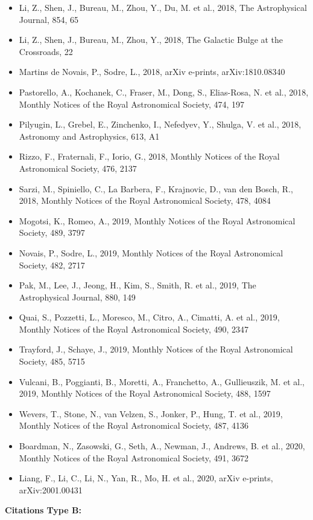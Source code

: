 \documentclass{letter}
\begin{document}
\begin{enumerate}
\begin{itemize}
\item Li, Z., Shen, J., Bureau, M., Zhou, Y., Du, M. et al., 2018, The Astrophysical Journal, 854, 65
\item Li, Z., Shen, J., Bureau, M., Zhou, Y., 2018, The Galactic Bulge at the Crossroads, 22
\item Martins de Novais, P., Sodre, L., 2018, arXiv e-prints, arXiv:1810.08340
\item Pastorello, A., Kochanek, C., Fraser, M., Dong, S., Elias-Rosa, N. et al., 2018, Monthly Notices of the Royal Astronomical Society, 474, 197
\item Pilyugin, L., Grebel, E., Zinchenko, I., Nefedyev, Y., Shulga, V. et al., 2018, Astronomy and Astrophysics, 613, A1
\item Rizzo, F., Fraternali, F., Iorio, G., 2018, Monthly Notices of the Royal Astronomical Society, 476, 2137
\item Sarzi, M., Spiniello, C., La Barbera, F., Krajnovic, D., van den Bosch, R., 2018, Monthly Notices of the Royal Astronomical Society, 478, 4084
\item Mogotsi, K., Romeo, A., 2019, Monthly Notices of the Royal Astronomical Society, 489, 3797
\item Novais, P., Sodre, L., 2019, Monthly Notices of the Royal Astronomical Society, 482, 2717
\item Pak, M., Lee, J., Jeong, H., Kim, S., Smith, R. et al., 2019, The Astrophysical Journal, 880, 149
\item Quai, S., Pozzetti, L., Moresco, M., Citro, A., Cimatti, A. et al., 2019, Monthly Notices of the Royal Astronomical Society, 490, 2347
\item Trayford, J., Schaye, J., 2019, Monthly Notices of the Royal Astronomical Society, 485, 5715
\item Vulcani, B., Poggianti, B., Moretti, A., Franchetto, A., Gullieuszik, M. et al., 2019, Monthly Notices of the Royal Astronomical Society, 488, 1597
\item Wevers, T., Stone, N., van Velzen, S., Jonker, P., Hung, T. et al., 2019, Monthly Notices of the Royal Astronomical Society, 487, 4136
\item Boardman, N., Zasowski, G., Seth, A., Newman, J., Andrews, B. et al., 2020, Monthly Notices of the Royal Astronomical Society, 491, 3672
\item Liang, F., Li, C., Li, N., Yan, R., Mo, H. et al., 2020, arXiv e-prints, arXiv:2001.00431
\end{itemize}
{\bf Citations Type B:}
\begin{itemize}

\end{itemize}
\end{enumerate}
\end{document}
